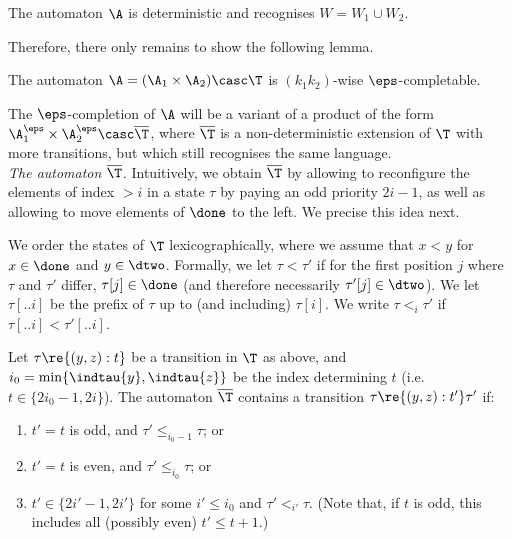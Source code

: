\begin{claim}
    The automaton $\A$ is deterministic and recognises $W=W_{1} \cup W_{2}$.
\end{claim}


Therefore, there only remains to show the following lemma.

\begin{lemma}\label{lem:product-with-T-epsCompl}
    The automaton $\A=(\A_{1} \times \A_{2}) \casc \T$ is $(k_1k_2)$-wise $\eps$-completable.
\end{lemma}

The $\eps$-completion of $\A$ will be a variant of a product of the form $\A_1^\eps \times \A_2^\eps \casc \overline \T$, where $\overline \T$ is a non-deterministic extension of $\T$ with more transitions, but which still recognises the same language.\\

\textit{The automaton $\overline \T$.}
Intuitively, we obtain $\overline \T$ by allowing to reconfigure the elements of index $>i$ in a state $\tau$ by paying an odd priority $2i-1$, as well as allowing to move elements of $\done$ to the left. We precise this idea next.

We order the states of $\T$ lexicographically, where we assume that $x < y$ for $x\in \done$ and $y\in \dtwo$.
Formally, we let $\tau < \tau'$ if for the first position $j$ where $\tau$ and $\tau'$ differ, $\tau[j]\in \done$ (and therefore necessarily $\tau'[j]\in \dtwo$).
We let $\tau[..i]$ be the prefix of $\tau$ up to (and including) $\tau[i]$.
We write $\tau <_i \tau'$ if $\tau[..i] < \tau'[..i]$. %

Let $\tau \re{(y,z):t}$ be a transition in $\T$ as above, and $i_0 = \min \{ \indtau{y}, \indtau{z}\}$ be the index determining $t$ (i.e. $t\in \{ 2i_0-1, 2i\}$). The automaton $\overline \T$ contains a transition $\tau \re{(y,z):t'} \tau'$ if:

\begin{enumerate}
    \item $t' = t$ is odd, and $\tau' \leq_{i_0-1} \tau$; or
    \item $t' = t$ is even, and $\tau' \leq_{i_0} \tau$; or
    \item $t' \in \{2i'-1, 2i'\}$ for some $i' \leq i_0$ and $\tau' <_{i'} \tau$. (Note that, if $t$ is odd, this includes all (possibly even) $t'\leq t+1$.)
\end{enumerate}

